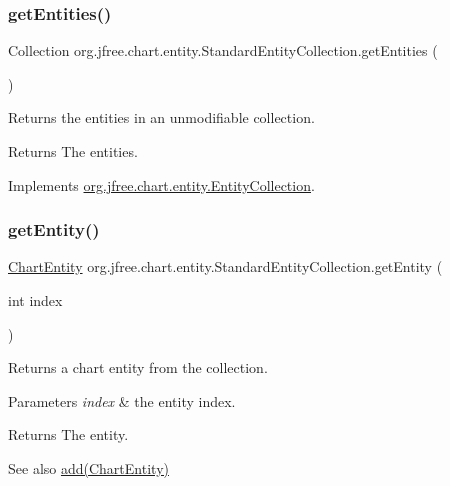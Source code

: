 \subsubsection{\texorpdfstring{get\+Entities()}{getEntities()}}
{\footnotesize\ttfamily Collection org.\+jfree.\+chart.\+entity.\+Standard\+Entity\+Collection.\+get\+Entities (\begin{DoxyParamCaption}{ }\end{DoxyParamCaption})}

Returns the entities in an unmodifiable collection.

\begin{DoxyReturn}{Returns}
The entities. 
\end{DoxyReturn}


Implements \mbox{\hyperlink{interfaceorg_1_1jfree_1_1chart_1_1entity_1_1_entity_collection_a6c5ae749a998551433c0e172bf11cfb6}{org.\+jfree.\+chart.\+entity.\+Entity\+Collection}}.

\mbox{\label{classorg_1_1jfree_1_1chart_1_1entity_1_1_standard_entity_collection_ab0e34b7a08332d1bca47c42026f04bbb}} 
\subsubsection{\texorpdfstring{get\+Entity()}{getEntity()}\hspace{0.1cm}{\footnotesize\ttfamily [1/2]}}
{\footnotesize\ttfamily \mbox{\hyperlink{classorg_1_1jfree_1_1chart_1_1entity_1_1_chart_entity}{Chart\+Entity}} org.\+jfree.\+chart.\+entity.\+Standard\+Entity\+Collection.\+get\+Entity (\begin{DoxyParamCaption}\item[{int}]{index }\end{DoxyParamCaption})}

Returns a chart entity from the collection.


\begin{DoxyParams}{Parameters}
{\em index} & the entity index.\\
\hline
\end{DoxyParams}
\begin{DoxyReturn}{Returns}
The entity.
\end{DoxyReturn}
\begin{DoxySeeAlso}{See also}
\mbox{\hyperlink{classorg_1_1jfree_1_1chart_1_1entity_1_1_standard_entity_collection_a9a5df7e5ad5a7b41808b75b63f9aa0f6}{add(\+Chart\+Entity)}} 
\end{DoxySeeAlso}


